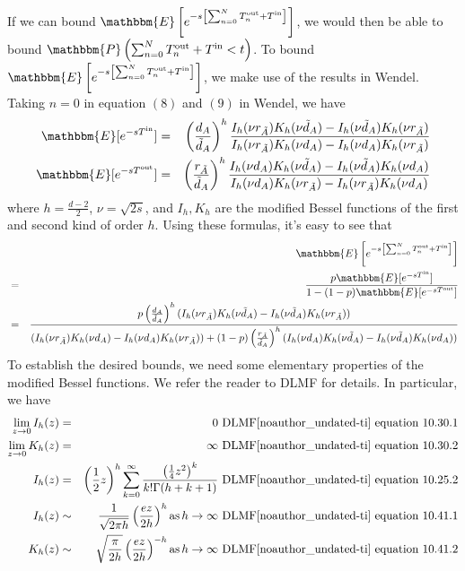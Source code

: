 \documentclass[english, aip, jcp, priprint, graphicx]{revtex4-1}
\newcommand{\tmop}[1]{\ensuremath{\operatorname{#1}}}
\theoremstyle{plain}
\theoremstyle{definition}
\theoremstyle{plain}
\begin{document}
If we can bound $\mathbbm{E} \left[ e^{- s \left[ \sum_{n = 0}^N
T_n^{\tmop{out}} + T^{\tmop{in}} \right]} \right]$, we would then be able to
bound $\mathbbm{P} \left( \sum_{n = 0}^N T_n^{\tmop{out}} + T^{\tmop{in}} < t
\right)$. To bound $\mathbbm{E} \left[ e^{- s \left[ \sum_{n = 0}^N
T_n^{\tmop{out}} + T^{\tmop{in}} \right]} \right]$, we make use of the results
in Wendel\cite{Wendel1980-sj}. Taking $n = 0$ in equation
$(8)$ and $(9)$ in Wendel\cite{Wendel1980-sj}, we have
\begin{eqnarray*}
\mathbbm{E} [e^{- sT^{\tmop{in}}}] & = & \left( \frac{d_A}{\tilde{d}_A}
\right)^h \frac{I_h (\nu r_{\tilde{A}}) K_h (\nu \tilde{d}_A) - I_h (\nu
\tilde{d}_A) K_h (\nu r_{\tilde{A}})}{I_h (\nu r_{\tilde{A}}) K_h (\nu d_A)
- I_h (\nu d_A) K_h (\nu r_{\tilde{A}})}\\
\mathbbm{E} [e^{- sT^{\tmop{out}}}] & = & \left(
\frac{r_{\tilde{A}}}{\tilde{d}_A} \right)^h \frac{I_h (\nu d_A) K_h (\nu
\tilde{d}_A) - I_h (\nu \tilde{d}_A) K_h (\nu d_A)}{I_h (\nu d_A) K_h (\nu
r_{\tilde{A}}) - I_h (\nu r_{\tilde{A}}) K_h (\nu d_A)}
\end{eqnarray*}
where $h = \frac{d - 2}{2}$, $\nu = \sqrt{2 s}$, and $I_h, K_h$ are the
modified Bessel functions of the first and second kind of order $h$. Using
these formulas, it's easy to see that
\begin{eqnarray*}
&  & \mathbbm{E} \left[ e^{- s \left[ \sum_{n = 0}^N T_n^{\tmop{out}} +
T^{\tmop{in}} \right]} \right]\\
& = & \frac{p\mathbbm{E} [e^{- sT^{\tmop{in}}}]}{1 - (1 - p) \mathbbm{E}
[e^{- sT^{\tmop{out}}}]}\\
& = & \frac{p \left( \frac{d_A}{\tilde{d}_A} \right)^h (I_h (\nu
r_{\tilde{A}}) K_h (\nu \tilde{d}_A) - I_h (\nu \tilde{d}_A) K_h (\nu
r_{\tilde{A}}))}{(I_h (\nu r_{\tilde{A}}) K_h (\nu d_A) - I_h (\nu d_A) K_h
(\nu r_{\tilde{A}})) + (1 - p) \left( \frac{r_{\tilde{A}}}{\tilde{d}_A}
\right)^h (I_h (\nu d_A) K_h (\nu \tilde{d}_A) - I_h (\nu \tilde{d}_A) K_h
(\nu d_A))}
\end{eqnarray*}
To establish the desired bounds, we need some elementary properties of the
modified Bessel functions. We refer the reader to DLMF\cite{noauthor_undated-ti} for details. In
particular, we have
\begin{eqnarray*}
\lim_{z \rightarrow 0} I_h (z) & = & 0 \text{ DLMF\cite{noauthor_undated-ti} equation 10.30.1}\\
\lim_{z \rightarrow 0} K_h (z) & = & \infty \text{ DLMF\cite{noauthor_undated-ti} equation 10.30.2}\\
I_h (z) & = & \left( \frac{1}{2} z \right)^h \sum_{k = 0}^{\infty}
\frac{\left( \frac{1}{4} z^2 \right)^k}{k! \Gamma (h + k + 1)} \text{ DLMF\cite{noauthor_undated-ti}
equation 10.25.2}\\
I_h (z) & \sim & \frac{1}{\sqrt{2 \pi h}} \left( \frac{ez}{2 h} \right)^h
\tmop{as} h \rightarrow \infty \text{ DLMF\cite{noauthor_undated-ti} equation 10.41.1}\\
K_h (z) & \sim & \sqrt{\frac{\pi}{2 h}} \left( \frac{ez}{2 h} \right)^{- h}
\tmop{as} h \rightarrow \infty \text{ DLMF\cite{noauthor_undated-ti} equation 10.41.2}
\end{eqnarray*}
\end{document}
